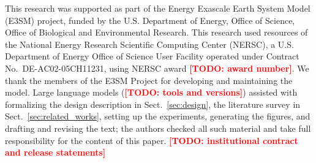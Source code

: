 \documentclass[gmd, manuscript]{copernicus}
\newcommand{\todo}[1]{\textcolor{red}{\textbf{[TODO: #1]}}}
\begin{document}
\begin{acknowledgements}
  This research was supported as part of the Energy Exascale Earth System Model (E3SM) project, funded by the U.S. Department of Energy, Office of Science, Office of Biological and Environmental Research. This research used resources of the National Energy Research Scientific Computing Center (NERSC), a U.S. Department of Energy Office of Science User Facility operated under Contract No.\ DE-AC02-05CH11231, using NERSC award \todo{award number}. We thank the members of the E3SM Project for developing and maintaining the model. Large language models (\todo{tools and versions}) assisted with formalizing the design description in Sect.~\ref{sec:design}, the literature survey in Sect.~\ref{sec:related_works}, setting up the experiments, generating the figures, and drafting and revising the text; the authors checked all such material and take full responsibility for the content of this paper. \todo{institutional contract and release statements}
\end{acknowledgements}




\end{document}
